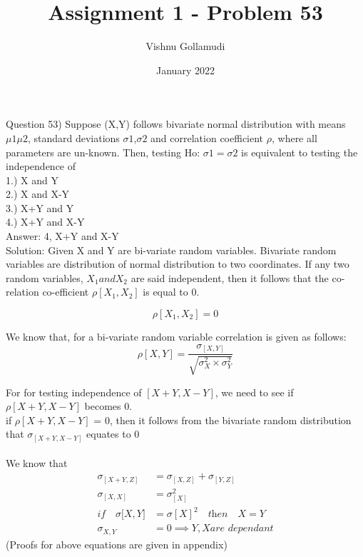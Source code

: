 \documentclass{article}
\title{Assignment 1 - Problem 53}
\author{Vishnu Gollamudi}
\date{January 2022}
\begin{document}
\maketitle

Question 53) Suppose (X,Y) follows bivariate normal distribution with means $\mu1  \mu2$, standard deviations $\sigma1$,$\sigma2$ and correlation coefficient $\rho$, where all parameters are un-known. Then, testing Ho: $\sigma1=\sigma2$ is equivalent to testing the independence of  
\\
1.) X and Y \\
2.) X and X-Y \\
3.) X+Y and Y \\
4.) X+Y and X-Y \\

Answer: 4, X+Y and X-Y \\
Solution:
Given X and Y are bi-variate random variables.  Bivariate random variables are distribution of normal distribution to two coordinates. If any two random variables, $ X_1 and X_2$ are said independent, then it follows that the co-relation co-efficient $\rho[X_1,X_2]$ is equal to 0. \smallskip

\begin{equation*}
\rho[X_1,X_2]  = 0
\end{equation*}

We know that, for a bi-variate random variable correlation is given as follows:
\begin{equation*}
    \rho[X,Y] = \frac{\sigma_{[X,Y]} } {\sqrt{\sigma_X^2 \times \sigma_Y^2}}
\end{equation*}


For for testing independence of $[X+Y, X-Y]$, we need to see if  $\rho[X+Y,X-Y]$ becomes 0.\\
if  $\rho[X+Y,X-Y]$  = 0, then it follows from the bivariate random distribution that $\sigma_{[X+Y,X-Y]}$ equates to 0\\
\\
We know that
\\
\begin{align}
  \sigma_{[X+Y,Z]} &= \sigma_{[X,Z]} + \sigma_{[Y,Z]} \\
  \sigma_{[X,X]} &= \sigma_{[X]}^2 \\
  \textit{if}\quad \sigma{[X,Y}] &= \sigma{[X]}^2 \quad \textit{then} \quad X=Y\\
  \sigma_{X,Y} &= 0 \implies Y,X \textit{are dependant}
\end{align}
\large (Proofs for above equations are given in appendix)
\end{document}
